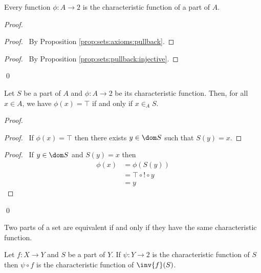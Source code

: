 \begin{prop}
 Every function $\phi : A \rightarrow 2$ is the characteristic function of a
 part of $A$.
\end{prop}

\begin{proof}
 \pf
 \begin{proof}
   \pf\ By Proposition \ref{prop:sets:axioms:pullback}.
 \end{proof}
 \begin{proof}
   \pf\ By Proposition \ref{prop:sets:pullback:injective}.
 \end{proof}
 \qed
\end{proof}

\begin{prop}
  Let $S$ be a part of $A$ and $\phi : A \rightarrow 2$ be its characteristic function. Then, for all $x \in A$, we have $\phi(x) = \top$ if and only if $x \in_A S$.
\end{prop}

\begin{proof}
  \pf
    \begin{proof}
      \pf\ If $\phi(x) = \top$ then there exists $y \in \dom S$ such that $S(y) = x$.
    \end{proof}
    \begin{proof}
      \pf\ If $y \in \dom S$ and $S(y) = x$ then
      \begin{align*}
        \phi(x) & = \phi(S(y)) \\
        & = \top \circ ! \circ y \\
        & = y
      \end{align*}
    \end{proof}
  \qed
\end{proof}

\begin{cor}
  Two parts of a set are equivalent if and only if they have the same characteristic function.
\end{cor}

\begin{prop}
  Let $f : X \rightarrow Y$ and $S$ be a part of $Y$. If $\psi : Y \rightarrow 2$ is the characteristic function of $S$
  then $\psi \circ f$ is the characteristic function of $\inv{f}(S)$.
\end{prop}

